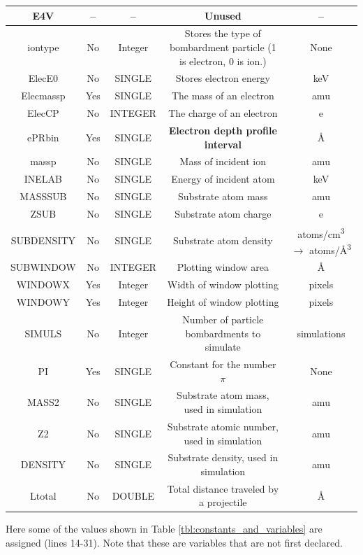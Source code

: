 \documentclass[10pt, reqno]{exam}
\begin{document}
{\begin{longtable}{|c|c|c|c|c|}
        E4V     & -- & -- & Unused & --  \\
        \hline
        iontype & No & Integer & Stores the type of bombardment particle (1 is electron, 0 is ion.) & None \\
        ElecE0 & No & SINGLE & Stores electron energy & keV \\
        Elecmassp & Yes & SINGLE & The mass of an electron & amu \\
        ElecCP & No & INTEGER & The charge of an electron & e \\
        ePRbin & Yes & SINGLE & \textbf{Electron depth profile interval} & \si{\angstrom} \\
        massp & No & SINGLE & Mass of incident ion & amu \\
        INELAB & No & SINGLE & Energy of incident atom & keV \\
        MASSSUB & No & SINGLE & Substrate atom mass & amu \\
        ZSUB & No & SINGLE & Substrate atom charge & e \\
        SUBDENSITY & No & SINGLE & Substrate atom density & \si{atoms/cm^3} $\rightarrow$ \si{atoms/\angstrom^3} \\
        SUBWINDOW & No & INTEGER & Plotting window area & \si{\angstrom} \\
        WINDOWX & Yes & Integer & Width of window plotting & pixels \\
        WINDOWY & Yes & Integer & Height of window plotting & pixels \\
        SIMULS & No & Integer & Number of particle bombardments to simulate & simulations \\
        PI & Yes & SINGLE & Constant for the number $\pi$ & None \\
        \hline
        MASS2 & No & SINGLE & Substrate atom mass, used in simulation & amu \\
        Z2 & No & SINGLE & Substrate atomic number, used in simulation & amu \\
        DENSITY & No & SINGLE & Substrate density, used in simulation & amu \\
        Ltotal & No & DOUBLE & Total distance traveled by a projectile & \si{\angstrom} \\
        \hline
    \end{longtable}
}
\pagebreak

Here some of the values shown in Table \ref{tbl:constants_and_variables} are assigned (lines 14-31). Note that these are variables that are not first declared. \par
\end{document}
